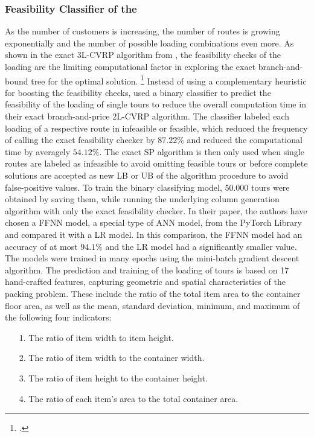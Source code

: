 \subsubsection{Feasibility Classifier of the }
As the number of customers is increasing, the number of routes is growing exponentially and the number of
possible loading combinations even more. As shown in the exact \gls{3L-CVRP} algorithm from \cite{tamke_branch-and-cut_2024},
the feasibility checks of the loading are the limiting computational factor in
exploring the exact branch-and-bound tree for the optimal solution. \footcite[cf.][p.22]{tamke_branch-and-cut_2024}
Instead of using a complementary heuristic for boosting the feasibility checks,
\textcite{zhang_learning-based_2022} used a binary classifier to predict the feasibility of the
loading of single tours to reduce the overall computation time in their exact branch-and-price \gls{2L-CVRP}
algorithm. The classifier labeled each loading of a respective route in infeasible or feasible, which
reduced the frequency of calling the exact feasibility checker by $87.22\%$ and reduced the computational time by averagely $54.12\%$.
The exact \gls{SP} algorithm is then only used when single routes are labeled as infeasible to avoid
omitting feasible tours or before complete solutions are accepted as new \gls{LB} or \gls{UB} of the
algorithm procedure to avoid false-positive values. To train the binary classifying model,
50.000 tours were obtained by saving them, while running the underlying column generation
algorithm with only the exact feasibility checker. In their paper, the authors have chosen a \gls{FFNN} model, a special type of \gls{ANN} model,
from the PyTorch Library and compared it with a \gls{LR} model. In this comparison, the \gls{FFNN} model had
an accuracy of at most $94.1\%$ and the \gls{LR} model had a significantly smaller value.
The models were trained in many epochs using the mini-batch gradient descent algorithm. The prediction and training
of the loading of tours is based on 17 hand-crafted features, capturing geometric
and spatial characteristics of the packing problem. These include the ratio of the total item area
to the container floor area, as well as the mean, standard deviation, minimum, and maximum of
the following four indicators:
\begin{itemize}
    \item[1.] The ratio of item width to item height.
    \item[2.] The ratio of item width to the container width.
    \item[3.] The ratio of item height to the container height.
    \item[4.] The ratio of each item’s area to the total container area.
\end{itemize}

